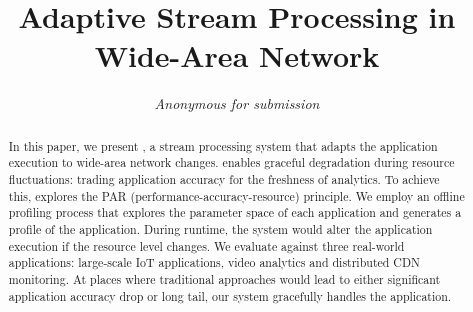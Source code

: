 \documentclass{sig-alternate-10pt}
\begin{document}



\title{Adaptive Stream Processing in Wide-Area Network}

\author{ \alignauthor \textit{Anonymous for submission} }

\maketitle

\begin{abstract}
  In this paper, we present \sysname{}, a stream processing system that adapts
  the application execution to wide-area network changes. \sysname{} enables
  graceful degradation during resource fluctuations: trading application
  accuracy for the freshness of analytics. To achieve this, \sysname{} explores
  the PAR (performance-accuracy-resource) principle. We employ an offline
  profiling process that explores the parameter space of each application and
  generates a profile of the application. During runtime, the system would alter
  the application execution if the resource level changes. We evaluate
  \sysname{} against three real-world applications: large-scale IoT
  applications, video analytics and distributed CDN monitoring. At places where
  traditional approaches would lead to either significant application accuracy
  drop or long tail, our system gracefully handles the application.
\end{abstract}









{}
\end{document}
